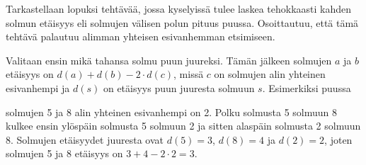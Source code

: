 Tarkastellaan lopuksi tehtävää,
jossa kyselyissä tulee laskea tehokkaasti
kahden solmun etäisyys eli solmujen välisen polun pituus puussa.
Osoittautuu, että tämä tehtävä
palautuu alimman yhteisen esivanhemman etsimiseen.

Valitaan ensin mikä tahansa
solmu puun juureksi.
Tämän jälkeen solmujen $a$ ja $b$
etäisyys on $d(a)+d(b)-2 \cdot d(c)$,
missä $c$ on solmujen alin yhteinen esivanhempi
ja $d(s)$ on etäisyys puun juuresta solmuun $s$.
Esimerkiksi puussa

\begin{center}
\end{center}
solmujen 5 ja 8 alin yhteinen esivanhempi on 2.
Polku solmusta 5 solmuun 8
kulkee ensin ylöspäin solmusta 5
solmuun 2 ja sitten alaspäin
solmusta 2 solmuun 8.
Solmujen etäisyydet juuresta ovat $d(5)=3$,
$d(8)=4$ ja $d(2)=2$,
joten solmujen 5 ja 8 etäisyys
on $3+4-2\cdot2=3$.


